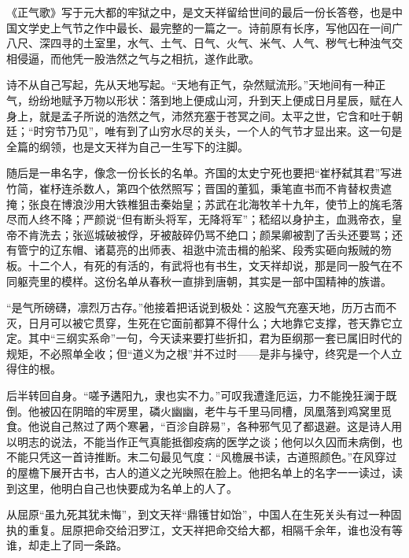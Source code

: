 \begin{appreciation}
《正气歌》写于元大都的牢狱之中，是文天祥留给世间的最后一份长答卷，也是中国文学史上气节之作中最长、最完整的一篇之一。诗前原有长序，写他囚在一间广八尺、深四寻的土室里，水气、土气、日气、火气、米气、人气、秽气七种浊气交相侵逼，而他凭一股浩然之气与之相抗，遂作此歌。

诗不从自己写起，先从天地写起。“天地有正气，杂然赋流形。”天地间有一种正气，纷纷地赋予万物以形状：落到地上便成山河，升到天上便成日月星辰，赋在人身上，就是孟子所说的浩然之气，沛然充塞于苍冥之间。太平之世，它含和吐于朝廷；“时穷节乃见”，唯有到了山穷水尽的关头，一个人的气节才显出来。这一句是全篇的纲领，也是文天祥为自己一生写下的注脚。

随后是一串名字，像念一份长长的名单。齐国的太史宁死也要把“崔杼弑其君”写进竹简，崔杼连杀数人，第四个依然照写；晋国的董狐，秉笔直书而不肯替权贵遮掩；张良在博浪沙用大铁椎狙击秦始皇；苏武在北海牧羊十九年，使节上的旄毛落尽而人终不降；严颜说“但有断头将军，无降将军”；嵇绍以身护主，血溅帝衣，皇帝不肯洗去；张巡城破被俘，牙被敲碎仍骂不绝口；颜杲卿被割了舌头还要骂；还有管宁的辽东帽、诸葛亮的出师表、祖逖中流击楫的船桨、段秀实砸向叛贼的笏板。十二个人，有死的有活的，有武将也有书生，文天祥却说，那是同一股气在不同躯壳里的模样。这份名单从春秋一直排到唐朝，其实是一部中国精神的族谱。

“是气所磅礴，凛烈万古存。”他接着把话说到极处：这股气充塞天地，历万古而不灭，日月可以被它贯穿，生死在它面前都算不得什么；大地靠它支撑，苍天靠它立定。其中“三纲实系命”一句，今天读来要打些折扣，君为臣纲那一套已属旧时代的规矩，不必照单全收；但“道义为之根”并不过时——是非与操守，终究是一个人立得住的根。

后半转回自身。“嗟予遘阳九，隶也实不力。”可叹我遭逢厄运，力不能挽狂澜于既倒。他被囚在阴暗的牢房里，磷火幽幽，老牛与千里马同槽，凤凰落到鸡窝里觅食。他说自己熬过了两个寒暑，“百沴自辟易”，各种邪气见了都退避。这是诗人用以明志的说法，不能当作正气真能抵御疫病的医学之谈；他何以久囚而未病倒，也不能只凭这一首诗推断。末二句最见气度：“风檐展书读，古道照颜色。”在风穿过的屋檐下展开古书，古人的道义之光映照在脸上。他把名单上的名字一一读过，读到这里，他明白自己也快要成为名单上的人了。

从屈原“虽九死其犹未悔”，到文天祥“鼎镬甘如饴”，中国人在生死关头有过一种固执的重复。屈原把命交给汨罗江，文天祥把命交给大都，相隔千余年，谁也没有等谁，却走上了同一条路。
\end{appreciation}
